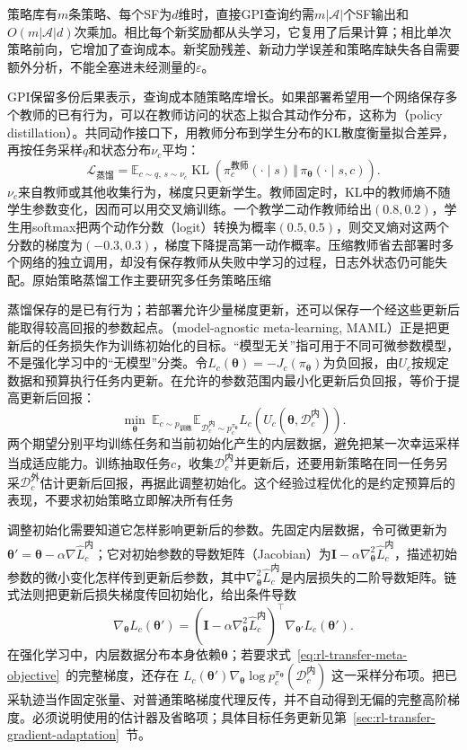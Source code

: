 策略库有$m$条策略、每个SF为$d$维时，直接GPI查询约需$m|\mathcal A|$个SF输出和$O(m|\mathcal A|d)$次乘加。相比每个新奖励都从头学习，它复用了后果计算；相比单次策略前向，它增加了查询成本。新奖励残差、新动力学误差和策略库缺失各自需要额外分析，不能全塞进未经测量的$\varepsilon$。

GPI保留多份后果表示，查询成本随策略库增长。如果部署希望用一个网络保存多个教师的已有行为，可以在教师访问的状态上拟合其动作分布，这称为（policy distillation）。共同动作接口下，用教师分布到学生分布的KL散度衡量拟合差异，再按任务采样$q$和状态分布$\nu_c$平均：
\[
 \mathcal L_{\text{蒸馏}}=
 \mathbb E_{c\sim q,\,s\sim\nu_c}
 \operatorname{KL}\!\left(\pi_c^{\text{教师}}(\cdot\mid s)
       \,\Vert\,\pi_{\bm\theta}(\cdot\mid s,c)\right).
\]
$\nu_c$来自教师或其他收集行为，梯度只更新学生。教师固定时，KL中的教师熵不随学生参数变化，因而可以用交叉熵训练。一个教学二动作教师给出$(0.8,0.2)$，学生用softmax把两个动作分数（logit）转换为概率$(0.5,0.5)$，则交叉熵对这两个分数的梯度为$(-0.3,0.3)$，梯度下降提高第一动作概率。压缩教师省去部署时多个网络的独立调用，却没有保存教师从失败中学习的过程，日志外状态仍可能失配。原始策略蒸馏工作主要研究多任务策略压缩

蒸馏保存的是已有行为；若部署允许少量梯度更新，还可以保存一个经这些更新后能取得较高回报的参数起点。（model-agnostic meta-learning, MAML）正是把更新后的任务损失作为训练初始化的目标。“模型无关”指可用于不同可微参数模型，不是强化学习中的“无模型”分类。令$L_c(\bm\theta)=-J_c(\pi_{\bm\theta})$为负回报，由$U_c$按规定数据和预算执行任务内更新。在允许的参数范围内最小化更新后负回报，等价于提高更新后回报：
\begin{equation}
 \min_{\bm\theta}\ %
 \mathbb E_{c\sim p_{\text{训练}}}
 \mathbb E_{\mathcal D_c^{\text{内}}\sim p_c^{\pi_{\bm\theta}}}
 L_c\!\left(U_c(\bm\theta,\mathcal D_c^{\text{内}})\right).
 \label{eq:rl-transfer-meta-objective}
\end{equation}
两个期望分别平均训练任务和当前初始化产生的内层数据，避免把某一次幸运采样当成适应能力。训练抽取任务$c$，收集$\mathcal D_c^{\text{内}}$并更新后，还要用新策略在同一任务另采$\mathcal D_c^{\text{外}}$估计更新后回报，再据此调整初始化。这个经验过程优化的是约定预算后的表现，不要求初始策略立即解决所有任务

调整初始化需要知道它怎样影响更新后的参数。先固定内层数据，令可微更新为$\bm\theta'=\bm\theta-\alpha\nabla\widehat L_c^{\text{内}}$；它对初始参数的导数矩阵（Jacobian）为$\bm I-\alpha\nabla_{\bm\theta}^2\widehat L_c^{\text{内}}$，描述初始参数的微小变化怎样传到更新后参数，其中$\nabla_{\bm\theta}^2\widehat L_c^{\text{内}}$是内层损失的二阶导数矩阵。链式法则把更新后损失梯度传回初始化，给出条件导数
\[
 \nabla_{\bm\theta}L_c(\bm\theta')
 =\left(\bm I-\alpha\nabla_{\bm\theta}^2\widehat L_c^{\text{内}}\right)^\top
       \nabla_{\bm\theta'}L_c(\bm\theta').
\]
在强化学习中，内层数据分布本身依赖$\bm\theta$；若要求式~\eqref{eq:rl-transfer-meta-objective}~的完整梯度，还存在
$L_c(\bm\theta')\nabla_{\bm\theta}\log p_c^{\pi_{\bm\theta}}(\mathcal D_c^{\text{内}})$
这一采样分布项。把已采轨迹当作固定张量、对普通策略梯度代理反传，并不自动得到无偏的完整高阶梯度。必须说明使用的估计器及省略项；具体目标任务更新见第~\ref{sec:rl-transfer-gradient-adaptation}~节。

